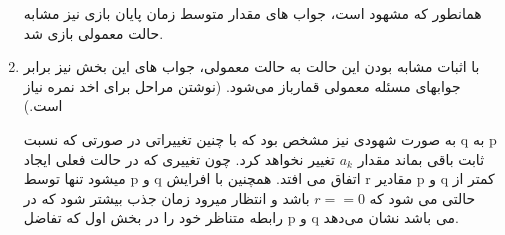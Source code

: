 \begin{enumerate}[label=(\alph*)]
	همانطور که مشهود است،‌ جواب های مقدار متوسط زمان پایان بازی نیز مشابه حالت معمولی بازی شد.
	
	\item
	با اثبات مشابه بودن این حالت به حالت معمولی،‌ جواب های این بخش نیز برابر جوابهای مسئله معمولی قمارباز می‌شود.
	(نوشتن مراحل برای اخد نمره نیاز است.)
	
	به صورت شهودی نیز مشخص بود که با چنین تغییراتی در صورتی که نسبت q به p ثابت باقی بماند مقدار
	${a_k}$ 
	تغییر نخواهد کرد. چون تغییری که در حالت فعلی ایجاد میشود تنها توسط p و q اتفاق می افتد. همچنین با افرایش r مقادیر p و q کمتر از حالتی می شود که
	$r= = 0$
	باشد و انتظار میرود زمان جذب بیشتر شود که در رابطه متناظر خود را در بخش اول که تفاضل p و q می باشد نشان می‌دهد.
	
\end{enumerate}
